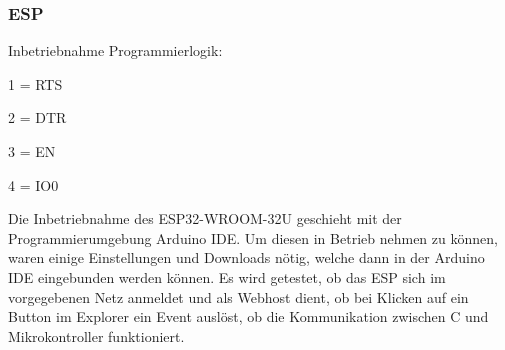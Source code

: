 \subsubsection{ESP}
\label{subsubsec:Inbetriebnahme_ESP}


Inbetriebnahme Programmierlogik:

1 = RTS

2 = DTR

3 = EN

4 = IO0



Die Inbetriebnahme des ESP32-WROOM-32U geschieht mit der Programmierumgebung Arduino IDE. Um diesen in Betrieb nehmen zu können, waren einige Einstellungen und Downloads nötig, welche dann in der Arduino IDE eingebunden werden können. Es wird getestet, ob das ESP sich im vorgegebenen Netz anmeldet und als Webhost dient, ob bei Klicken auf ein Button im Explorer ein Event auslöst, ob die Kommunikation zwischen \textmu C und Mikrokontroller funktioniert.

